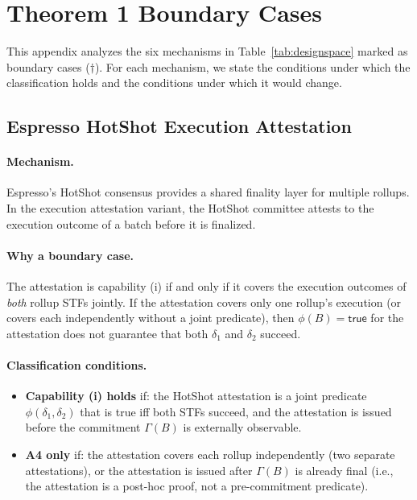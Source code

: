 %

\section{Theorem 1 Boundary Cases}
\label{app:boundary}

This appendix analyzes the six mechanisms in Table~\ref{tab:designspace}
marked as boundary cases ($\dagger$). For each mechanism, we state the
conditions under which the classification holds and the conditions under
which it would change.

\subsection{Espresso HotShot Execution Attestation}
\label{app:espresso}

\paragraph{Mechanism.}
Espresso's HotShot consensus provides a shared finality layer for multiple
rollups. In the execution attestation variant, the HotShot committee attests
to the execution outcome of a batch before it is finalized.

\paragraph{Why a boundary case.}
The attestation is capability (i) if and only if it covers the execution
outcomes of \emph{both} rollup STFs jointly. If the attestation covers only
one rollup's execution (or covers each independently without a joint predicate),
then $\phi(B) = \mathsf{true}$ for the attestation does not guarantee that
both $\delta_1$ and $\delta_2$ succeed.

\paragraph{Classification conditions.}
\begin{itemize}
  \item \textbf{Capability (i) holds} if: the HotShot attestation is a joint
    predicate $\phi(\delta_1, \delta_2)$ that is true iff both STFs succeed,
    and the attestation is issued before the commitment $\Gamma(B)$ is
    externally observable.
  \item \textbf{A4 only} if: the attestation covers each rollup independently
    (two separate attestations), or the attestation is issued after $\Gamma(B)$
    is already final (i.e., the attestation is a post-hoc proof, not a
    pre-commitment predicate).
\end{itemize}

